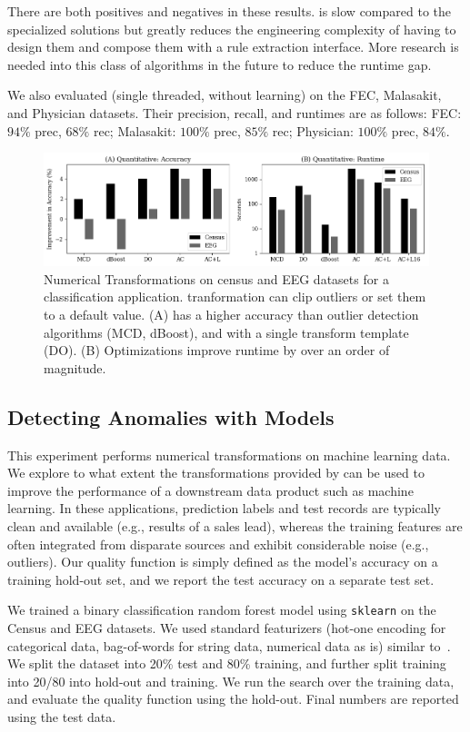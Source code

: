 There are both positives and negatives in these results. \sys is slow compared to the specialized solutions but greatly reduces the engineering complexity of having to design them and compose them with a rule extraction interface. More research is needed into this class of algorithms in the future to reduce the runtime gap.

We also evaluated \sys (single threaded, without learning) on the FEC, Malasakit, and Physician datasets.  Their precision, recall, and runtimes are as follows: 
FEC: $94\%$ prec, $68\%$ rec; 
Malasakit: $100\%$ prec, $85\%$ rec;
Physician: $100\%$ prec, $84\%$.

\begin{figure}
    \centering
    \includegraphics[width=\columnwidth]{exp/exp2.png}
    \caption{\small Numerical Transformations on census and EEG datasets for a classification application.  \sys tranformation can clip outliers or set them to a default value. (A) \sys has a higher accuracy than outlier detection algorithms (MCD, dBoost), and \sys with a single transform template (DO).  (B) Optimizations improve \sys runtime by over an order of magnitude.  \label{exp2a}}
\end{figure}

\subsection{Detecting Anomalies with Models}\label{s:expquant}
This experiment performs numerical transformations on machine learning data.  We explore to what extent the transformations provided by \sys can be used to improve the performance of a downstream data product such as machine learning. In these applications, prediction labels and test records are typically clean and available (e.g., results of a sales lead), whereas the training features are often integrated from disparate sources and exhibit considerable noise (e.g., outliers).  Our quality function is simply defined as the model's accuracy on a training hold-out set, and we report the test accuracy on a separate test set.

We trained a binary classification random forest model using \texttt{sklearn} on the Census and EEG datasets.  We used standard featurizers (hot-one encoding for categorical data, bag-of-words for string data, numerical data as is) similar to~\cite{gokhale2014corleone}. 
We split the dataset into 20\% test and 80\% training, and further split training into 20/80 into hold-out and training.  We run the search over the training data, and evaluate the quality function using the hold-out.  Final numbers are reported using the test data.

